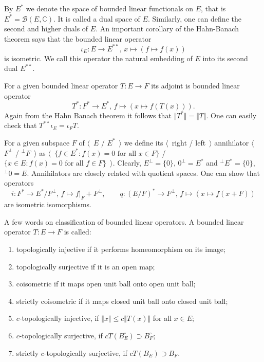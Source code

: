 By $E^*$ we denote the space of bounded linear functionals on $E$, that is
$E^*=\mathcal{B}(E, \mathbb{C})$. It is called a dual space of $E$. Similarly,
one can define the second and higher duals of $E$. An important corollary of the
Hahn-Banach theorem says that the bounded linear operator 
$$
\iota_E:E\to E^{**},\,x\mapsto (f\mapsto f(x))
$$ 
is isometric. We call this operator the natural embedding of $E$ into its 
second dual $E^{**}$.

For a given bounded linear operator $T:E\to F$ its adjoint is bounded linear 
operator 
$$
T^*:F^*\to E^*,\,f\mapsto (x\mapsto f(T(x))).
$$
Again from the Hahn Banach 
theorem it follows that $\Vert T^*\Vert=\Vert T\Vert$. One can easily check 
that $T^{**}\iota_E=\iota_F T$.  

For a given subspace $F$ of $\langle$~$E$ / $E^*$~$\rangle$ we define 
its $\langle$~right / left~$\rangle$ annihilator 
$\langle$~$F^\perp$ / ${}^\perp F$~$\rangle$ as 
$\langle$~$ \{ f\in E^*: f(x)=0 \mbox{ for all } x\in F \}$ / 
$ \{ x\in E : f(x)=0 \mbox{ for all } f\in F \}$~$\rangle$. 
Clearly, $E^{\perp} = \{ 0\}$, $0^{\perp}=E^*$ 
and ${}^{\perp}E^*= \{ 0\}$, ${}^{\perp}0= E$. Annihilators are closely related
with quotient spaces. One can show that 
operators 
$$
i: F^*\to E^*/F^{\perp},\, f\mapsto f|_F+F^\perp,
\quad\quad 
q:{(E/F)}^*\to F^{\perp},\, f\mapsto (x\mapsto f(x + F))
$$ 
are isometric isomorphisms.

A few words on classification of bounded linear operators. A bounded linear
operator $T:E\to F$ is called:
\begin{enumerate}[label = (\roman*)]
  \item topologically injective if it performs homeomorphism on its image;

  \item topologically surjective if it is an open map;

  \item coisometric if it maps open unit ball onto open unit ball;

  \item strictly coisometric if it maps closed unit ball onto closed unit ball; 

  \item $c$-topologically injective, if $\Vert x\Vert\leq c\Vert  T(x)\Vert$ for
  all $x\in E$;

  \item $c$-topologically surjective, if $cT(B_E^\circ)\supset B_F^\circ$;

  \item strictly $c$-topologically surjective, if $cT(B_E)\supset B_F$.
\end{enumerate}

